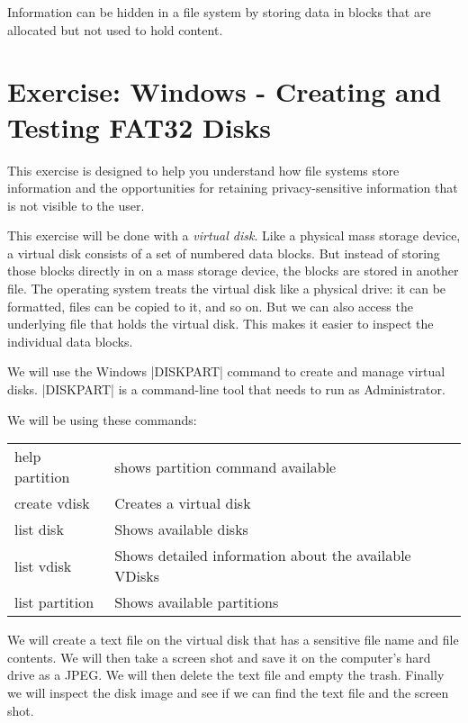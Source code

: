 Information can be hidden in a file system by storing data in blocks
that are allocated but not used to hold content\cite{dfrws2005:KnutEcksteinAndMarkoJahnke}. 

\section{Exercise: Windows - Creating and Testing FAT32 Disks}

This exercise is designed to help you understand how file systems
store information and the opportunities for retaining
privacy-sensitive information that is not visible to the user. 

This exercise will be done with a \emph{virtual disk}. Like a physical
mass storage device, a virtual disk consists of a set of numbered data
blocks. But instead of storing those blocks directly in on a mass
storage device, the blocks are stored in another file. The operating
system treats the virtual disk like a physical drive: it can be
formatted, files can be copied to it, and so on. But we can also
access the underlying file that holds the virtual disk. This makes it
easier to inspect the individual data blocks.

We will use the Windows |DISKPART| command to create and manage virtual
disks. |DISKPART| is a command-line tool that needs to run as
Administrator.

We will be using these commands:
\begin{tabular}{ll}
help partition & shows partition command available\\
create vdisk & Creates a virtual disk \\
list disk & Shows available disks \\
list vdisk & Shows detailed information about the available VDisks\\
list partition & Shows available partitions \\
\end{tabular}

We will create a text file on the virtual disk that has a sensitive file
name and file contents. We will then take a screen shot and save it on
the computer's hard drive as a JPEG. We will then delete the text file
and empty the trash. Finally we will inspect the disk image and see if
we can find the text file and the screen shot.


